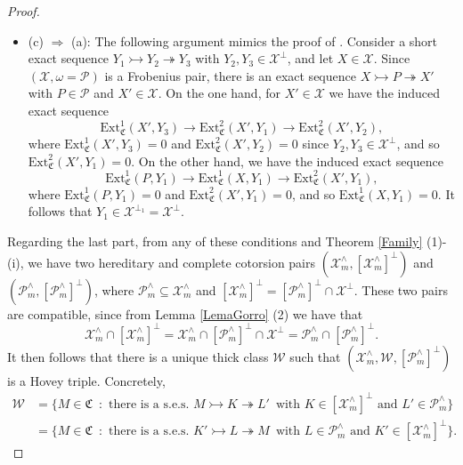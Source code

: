 \documentclass[10pt,reqno]{amsart}
\numberwithin{equation}{section}
\theoremstyle{remark}
\newcommand{\Ext}{\mathrm{Ext}}
\newcommand{\C}{\mathfrak{C}}
\newcommand{\X}{\mathcal{X}}
\begin{document}
\begin{proof}
\begin{itemize}
\item (c) $\Rightarrow$ (a): The following argument mimics the proof of \cite[Lem. 3.2 (2)]{Cortes}. Consider a short exact sequence $Y_1 \rightarrowtail Y_2 \twoheadrightarrow Y_3$ with $Y_2, Y_3 \in \mathcal{X}^\perp$, and let $X \in \mathcal{X}$. Since $(\mathcal{X},\omega = \mathcal{P})$ is a Frobenius pair, there is an exact sequence $X \rightarrowtail P \twoheadrightarrow X'$ with $P \in \mathcal{P}$ and $X' \in \mathcal{X}$. On the one hand, for $X' \in \mathcal{X}$ we have the induced exact sequence 
\[
\Ext^1_{\C}(X',Y_3) \to \Ext^2_{\C}(X',Y_1) \to \Ext^2_{\C}(X',Y_2),
\]
where $\Ext^1_{\C}(X',Y_3) = 0$ and $\Ext^2_{\C}(X',Y_2) = 0$ since $Y_2, Y_3 \in \mathcal{X}^\perp$, and so $\Ext^2_{\C}(X',Y_1) = 0$. On the other hand, we have the induced exact sequence
\[
\Ext^1_{\C}(P,Y_1) \to \Ext^1_{\C}(X,Y_1) \to \Ext^2_{\C}(X',Y_1),
\]
where $\Ext^1_{\C}(P,Y_1) = 0$ and $\Ext^2_{\C}(X',Y_1) = 0$, and so $\Ext^1_{\C}(X,Y_1) = 0$. It follows that $Y_1 \in \mathcal{X}^{\perp_1} = \mathcal{X}^\perp$. 
\end{itemize}
Regarding the last part, from any of these conditions and Theorem \ref{Family} (1)-(i), we have two hereditary and complete cotorsion pairs $(\mathcal{X}^\wedge_m, [\mathcal{X}^\wedge_m]^\perp)$ and $(\mathcal{P}^\wedge_m,[\mathcal{P}^\wedge_m]^\perp)$, where $\mathcal{P}^\wedge_m \subseteq \mathcal{X}^\wedge_m$ and $[\X^{\wedge}_m]^{\perp} = [\mathcal{P}^\wedge_m]^\perp \cap \X^\perp$. These two pairs are compatible, since from Lemma \ref{LemaGorro} (2) we have that
\[
\mathcal{X}^\wedge_m \cap [\mathcal{X}^\wedge_m]^\perp = \mathcal{X}^\wedge_m \cap [\mathcal{P}^\wedge_m]^\perp \cap \X^\perp = \mathcal{P}^\wedge_m \cap [\mathcal{P}^\wedge_m]^\perp.
\]
It then follows that there is a unique thick class $\mathcal{W}$ such that $(\mathcal{X}^\wedge_m,\mathcal{W},[\mathcal{P}^\wedge_m]^\perp)$ is a Hovey triple. Concretely, 
\begin{align*}
\mathcal{W} & = \{ M \in \C \, \text{ : } \, \text{there is a s.e.s. } M \rightarrowtail K \twoheadrightarrow L' \, \text{ with $K \in [\mathcal{X}^\wedge_m]^\perp$ and $L' \in \mathcal{P}^\wedge_m$} \} \\
& = \{ M \in \C \, \text{ : } \, \text{there is a s.e.s. } K' \rightarrowtail L \twoheadrightarrow M \, \text{ with $L \in \mathcal{P}^\wedge_m$ and $K' \in [\mathcal{X}^\wedge_m]^\perp$} \}. 
\end{align*}

\end{proof}
\end{document}
